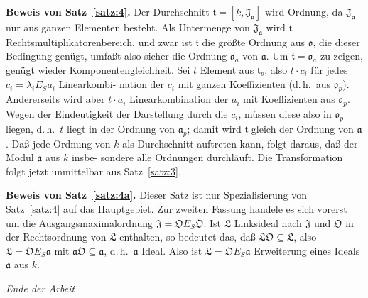 \documentclass[12pt,a4paper]{article}
\theoremstyle{plain}
\begin{document}
\medskip
\noindent\textbf{Beweis von Satz~\ref{satz:4}.}\hspace{0.5em}%
Der Durchschnitt $\mathfrak{t} = [k, \mathfrak{J}_{\mathfrak{a}}]$ wird Ordnung,
da $\mathfrak{J}_{\mathfrak{a}}$ nur aus ganzen Elementen besteht. Als Untermenge von $\mathfrak{J}_{\mathfrak{a}}$ wird
$\mathfrak{t}$ Rechtsmultiplikatorenbereich, und zwar ist $\mathfrak{t}$ die gr\"o\ss te Ordnung
aus $\mathfrak{o}$, die dieser Bedingung gen\"ugt, umfa\ss t also sicher die Ordnung
$\mathfrak{o}_a$ von $\mathfrak{a}$. Um $\mathfrak{t} = \mathfrak{o}_a$ zu zeigen, gen\"ugt wieder Komponentengleichheit.
Sei $t$ Element aus $\mathfrak{t}_p$, also $t \cdot c_i$ f\"ur jedes $c_i = \lambda_i E_S a_i$ Linearkombi-
nation der $c_i$ mit ganzen Koeffizienten (d.\,h.\ aus $\mathfrak{o}_p$). Andererseits
wird aber $t \cdot a_i$ Linearkombination der $a_i$ mit Koeffizienten aus $\mathfrak{o}_p$.
Wegen der Eindeutigkeit der Darstellung durch die $c_i$, m\"ussen diese
also in $\mathfrak{o}_p$ liegen, d.\,h.\ $t$ liegt in der Ordnung von $\mathfrak{a}_p$; damit wird
$\mathfrak{t}$ gleich der Ordnung von $\mathfrak{a}$. Da\ss{} jede Ordnung von $k$ als Durchschnitt
auftreten kann, folgt daraus, da\ss{} der Modul $\mathfrak{a}$ aus $k$ insbe-
sondere alle Ordnungen durchl\"auft. Die Transformation folgt jetzt
unmittelbar aus Satz~\ref{satz:3}.

\medskip
\noindent\textbf{Beweis von Satz~\ref{satz:4a}.}\hspace{0.5em}%
Dieser Satz ist nur Spezialisierung von
Satz~\ref{satz:4} auf das Hauptgebiet. Zur zweiten Fassung handele es
sich vorerst um die Ausgangsmaximalordnung $\mathfrak{J} = \mathfrak{O} E_S \mathfrak{O}$. Ist $\mathfrak{L}$ Linksideal
nach $\mathfrak{J}$ und $\mathfrak{O}$ in der Rechtsordnung von $\mathfrak{L}$ enthalten, so bedeutet das,
da\ss{} $\mathfrak{L} \mathfrak{O} \subseteq \mathfrak{L}$, also $\mathfrak{L} = \mathfrak{O} E_S \mathfrak{a}$ mit $\mathfrak{a} \mathfrak{O} \subseteq \mathfrak{a}$, d.\,h.\ $\mathfrak{a}$ Ideal.
Also ist $\mathfrak{L} = \mathfrak{O} E_S \mathfrak{a}$ Erweiterung eines Ideals $\mathfrak{a}$ aus $k$.

\begin{flushright}
\textit{Ende der Arbeit}
\end{flushright}
\end{document}
